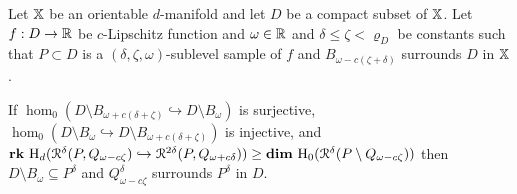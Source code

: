 \begin{theorem}\label{thm:algo_tcc}
  Let $\mathbb{X}$ be an orientable $d$-manifold and let $D$ be a compact subset of $\mathbb{X}$.
  Let $f : D\to\mathbb{R}$ be $c$-Lipschitz function and $\omega\in\mathbb{R}$ and $\delta\leq\zeta < \varrho_D$ be constants such that $P\subset D$ is a $(\delta,\zeta,\omega)$-sublevel sample of $f$ and $B_{\omega - c(\zeta +\delta)}$ surrounds $D$ in $\mathbb{X}$.

  If $\hom_0(D\setminus B_{\omega+c(\delta+\zeta)}\hookrightarrow D\setminus B_\omega)$ is surjective, $\hom_0(D\setminus B_\omega\hookrightarrow D\setminus B_{\omega+c(\delta+\zeta)})$ is injective, and $\mathbf{rk}~\mathrm{H}_d(\mathcal{R}^\delta(P, Q_{\omega -c\zeta})\hookrightarrow \mathcal{R}^{2\delta}(P, Q_{\omega+c\delta})) \geq \mathbf{dim}~\mathrm{H}_0(\mathcal{R}^\delta(P\setminus Q_{\omega-c\zeta}))$ then $D\setminus B_\omega\subseteq P^\delta$ and $Q_{\omega-c\zeta}^\delta$ surrounds $P^\delta$ in $D$.
\end{theorem}
